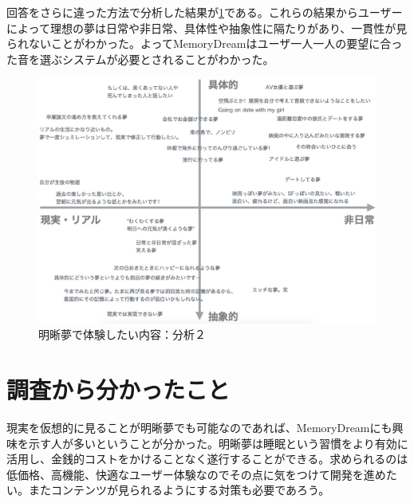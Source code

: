 回答をさらに違った方法で分析した結果が\ref{desiredDreamTpye2}である。これらの結果からユーザーによって理想の夢は日常や非日常、具体性や抽象性に隔たりがあり、一貫性が見られないことがわかった。よってMemoryDreamはユーザ一人一人の要望に合った音を選ぶシステムが必要とされることがわかった。

\begin{figure}[htbp]
\begin{center}
\includegraphics[width=15cm]{eps/whatYouWantToDream.eps}
\caption{明晰夢で体験したい内容：分析２}
\label{desiredDreamTpye2}
\end{center}
\end{figure}

\section{調査から分かったこと}
現実を仮想的に見ることが明晰夢でも可能なのであれば、MemoryDreamにも興味を示す人が多いということが分かった。明晰夢は睡眠という習慣をより有効に活用し、金銭的コストをかけることなく遂行することができる。求められるのは低価格、高機能、快適なユーザー体験なのでその点に気をつけて開発を進めたい。またコンテンツが見られるようにする対策も必要であろう。